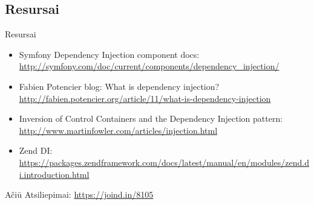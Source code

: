 \documentclass[12pt,a4paper]{beamer}
\begin{document}
\subsection{Resursai}
\begin{frame}{Resursai}
    \begin{itemize}
        \item Symfony Dependency Injection component docs: \url{http://symfony.com/doc/current/components/dependency_injection/}
        \item Fabien Potencier blog: What is dependency injection? \url{http://fabien.potencier.org/article/11/what-is-dependency-injection}
        \item Inversion of Control Containers and the Dependency Injection pattern: \url{http://www.martinfowler.com/articles/injection.html}
        \item Zend DI: \url{https://packages.zendframework.com/docs/latest/manual/en/modules/zend.di.introduction.html}
    \end{itemize}
\end{frame}

\begin{frame}
	\begin{center}
        {\Huge Ačiū}
        \vskip1cm
        Atsiliepimai: \url{https://joind.in/8105}
	\end{center}
\end{frame}
\end{document}
